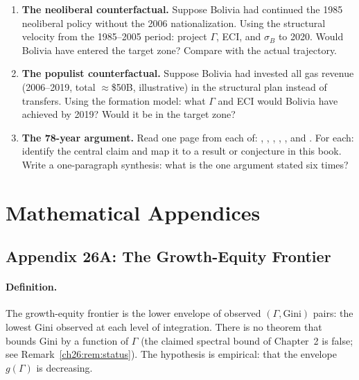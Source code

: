 \documentclass[../structural_economics_book.tex]{subfiles}
\begin{document}
\begin{enumerate}[label=\textbf{26.\arabic*}, leftmargin=3em]
\item \textbf{The neoliberal counterfactual.} Suppose Bolivia had continued the 1985 neoliberal policy without the 2006 nationalization. Using the structural velocity from the 1985--2005 period: project $\Gamma$, ECI, and $\sigma_B$ to 2020. Would Bolivia have entered the target zone? Compare with the actual trajectory.

\item \textbf{The populist counterfactual.} Suppose Bolivia had invested all gas revenue (2006--2019, total $\approx$\$50B, illustrative) in the structural plan instead of transfers. Using the formation model: what $\Gamma$ and ECI would Bolivia have achieved by 2019? Would it be in the target zone?

\item \textbf{The 78-year argument.} Read one page from each of: \citet{prebisch1949desarrollo}, \citet{furtado1961desenvolvimento}, \citet{pinto1970naturaleza}, \citet{fajnzylber1983industrializacion}, \citet{cepal2012structural}, and \citet{ocampo2009growth}. For each: identify the central claim and map it to a result or conjecture in this book. Write a one-paragraph synthesis: what is the one argument stated six times?
\end{enumerate}


\newpage
\section*{Mathematical Appendices}


\subsection*{Appendix 26A: The Growth-Equity Frontier}
\label{ch26:app:frontier}

\paragraph{Definition.} The growth-equity frontier is the lower envelope of observed $(\Gamma, \text{Gini})$ pairs: the lowest Gini observed at each level of integration. There is no theorem that bounds Gini by a function of $\Gamma$ (the claimed spectral bound of Chapter~2 is false; see Remark~\ref{ch26:rem:status}). The hypothesis is empirical: that the envelope $g(\Gamma)$ is decreasing.
\end{document}
